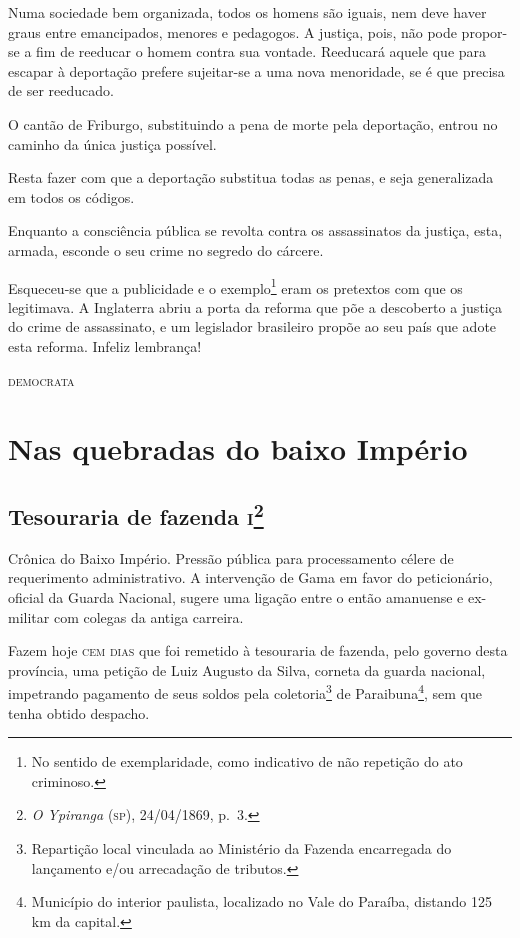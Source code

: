 Numa sociedade bem organizada, todos os homens são iguais, nem deve
haver graus entre emancipados, menores e pedagogos. A justiça, pois, não
pode propor-se a fim de reeducar o homem contra sua vontade. Reeducará
aquele que para escapar à deportação prefere sujeitar-se a uma nova
menoridade, se é que precisa de ser reeducado.

O cantão de Friburgo, substituindo a pena de morte pela deportação,
entrou no caminho da única justiça possível.

Resta fazer com que a deportação substitua todas as penas, e seja
generalizada em todos os códigos.

Enquanto a consciência pública se revolta contra os assassinatos da
justiça, esta, armada, esconde o seu crime no segredo do cárcere.

Esqueceu-se que a publicidade e o exemplo\footnote{No sentido de
  exemplaridade, como indicativo de não repetição do ato criminoso.}
eram os pretextos com que os legitimava. A Inglaterra abriu a porta da
reforma que põe a descoberto a justiça do crime de assassinato, e um
legislador brasileiro propõe ao seu país que adote esta reforma. Infeliz
lembrança!

\begin{flushright}
\textsc{democrata}
\end{flushright}

\part{Nas quebradas do baixo Império} %

\chapter{Tesouraria de fazenda \textsc{i}\footnote{\emph{O Ypiranga} (\textsc{sp}),
  24/04/1869, p.~3.}}

\begin{didascalia}
Crônica do Baixo Império. Pressão pública para processamento célere de
requerimento administrativo. A intervenção de Gama em favor do
peticionário, oficial da Guarda Nacional, sugere uma ligação entre o
então amanuense e ex-militar com colegas da antiga carreira.
\end{didascalia}


Fazem hoje \textsc{cem dias} que foi remetido à tesouraria de fazenda, pelo
governo desta província, uma petição de Luiz Augusto da Silva, corneta
da guarda nacional, impetrando pagamento de seus soldos pela
coletoria\footnote{Repartição local vinculada ao Ministério da Fazenda
  encarregada do lançamento e/ou arrecadação de tributos.} de
Paraibuna\footnote{Município do interior paulista, localizado no Vale
  do Paraíba, distando 125 km da capital.}, sem que tenha obtido
despacho.

